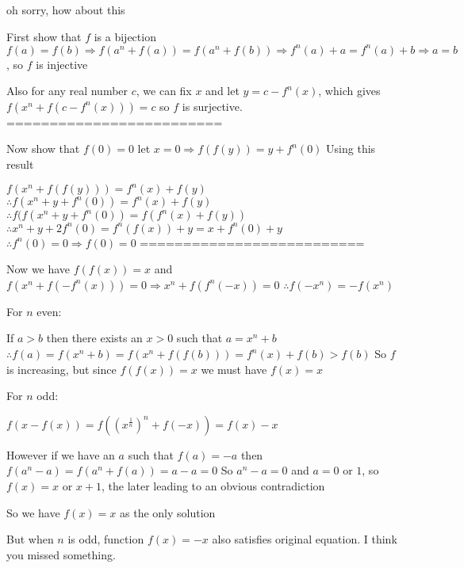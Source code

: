 \begin{solution}
	oh sorry, how about this

First show that $ f$ is a bijection
$ f(a) = f(b) \Rightarrow f(a^n + f(a)) = f(a^n + f(b)) \Rightarrow f^n(a) + a = f^n(a) + b \Rightarrow a = b$, so $ f$ is injective

Also for any real number $ c$, we can fix $ x$ and let $ y = c - f^n(x)$, which gives $ f(x^n + f(c - f^n(x))) = c$ so $ f$ is surjective.
=========================

Now show that $ f(0) = 0$
let $ x = 0 \Longrightarrow f(f(y)) = y + f^n(0)$ Using this result

$ f(x^n + f(f(y))) = f^n(x) + f(y)$
$ \therefore f(x^n + y + f^n(0)) = f^n(x) + f(y)$
$ \therefore f(f(x^n + y + f^n(0)) = f(f^n(x) + f(y))$
$ \therefore x^n + y + 2f^n(0) = f^n(f(x)) + y = x + f^n(0) + y$
$ \therefore f^n(0) = 0 \Longrightarrow f(0) = 0$
==========================

Now we have $ f(f(x)) = x$ and $ f(x^n + f( - f^n(x))) = 0 \Longrightarrow x^n + f(f^n( - x)) = 0$ 
$ \therefore f( - x^n) = - f(x^n)$

\begin{bolded}For $ n$ even:\end{bolded}
If $ a > b$ then there exists an $ x > 0$ such that $ a = x^n + b$
$ \therefore f(a) = f(x^n + b) = f(x^n + f(f(b))) = f^n(x) + f(b) > f(b)$
So $ f$ is increasing, but since $ f(f(x)) = x$ we must have $ f(x) = x$


\begin{bolded}For $ n$ odd:\end{bolded}
$ f(x - f(x)) = f((x^\frac {1}{n})^n + f(-x)) = f(x) - x$

However if we have an $ a$ such that $ f(a) = - a$ then
$ f(a^n - a) = f(a^n + f(a)) = a - a = 0$
So $ a^n - a = 0$ and $ a = 0$ or $ 1$, so $ f(x) = x$ or $ x + 1$, the later leading to an obvious contradiction

So we have $ f(x) = x$ as the only solution
\end{solution}



\begin{solution}
	But when $ n$ is odd, function $ f(x)=-x$ also satisfies original equation. I think you missed something.
\end{solution}



